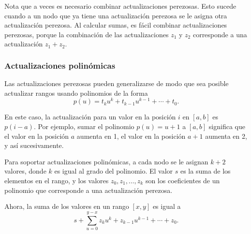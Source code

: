 \begin{center}
\end{center}

Nota que a veces es necesario combinar actualizaciones perezosas.
Esto sucede cuando a un nodo que ya tiene una actualización perezosa
se le asigna otra actualización perezosa.
Al calcular sumas, es fácil combinar actualizaciones perezosas,
porque la combinación de las actualizaciones $z_1$ y $z_2$
corresponde a una actualización $z_1+z_2$.

\subsubsection{Actualizaciones polinómicas}

Las actualizaciones perezosas pueden generalizarse de modo que sea
posible actualizar rangos usando polinomios de la forma
\[p(u) = t_k u^k + t_{k-1} u^{k-1} + \cdots + t_0.\]

En este caso, la actualización para un valor
en la posición $i$ en $[a,b]$ es $p(i-a)$.
Por ejemplo, sumar el polinomio $p(u)=u+1$
a $[a,b]$ significa que el valor en la posición $a$
aumenta en 1, el valor en la posición $a+1$
aumenta en 2, y así sucesivamente.

Para soportar actualizaciones polinómicas,
a cada nodo se le asignan $k+2$ valores,
donde $k$ es igual al grado del polinomio.
El valor $s$ es la suma de los elementos en el rango,
y los valores $z_0,z_1,\ldots,z_k$ son los coeficientes
de un polinomio que corresponde a una actualización perezosa.

Ahora, la suma de los valores en un rango $[x,y]$ es igual a
\[s+\sum_{u=0}^{y-x} z_k u^k + z_{k-1} u^{k-1} + \cdots + z_0.\]

